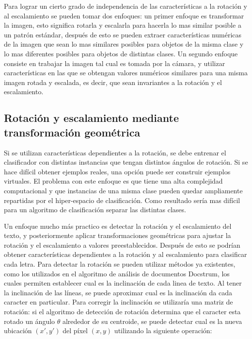 \documentclass[a4paper, 11pt, oneside]{report}
\begin{document}
Para lograr un cierto grado de independencia de las características a la rotación y al escalamiento se pueden tomar dos enfoques: un primer enfoque es transformar la imagen, esto significa rotarla y escalarla para hacerla lo mas similar posible a un patrón estándar, después de esto se pueden extraer características numéricas de la imagen que sean lo mas similares posibles para objetos de la misma clase y lo mas diferentes posibles para objetos de distintas clases. Un segundo enfoque consiste en trabajar la imagen tal cual es tomada por la cámara, y utilizar características en las que se obtengan valores numéricos similares para una misma imagen rotada y escalada, es decir, que sean invariantes a la rotación y el escalamiento.

\subsection{Rotación y escalamiento mediante transformación geométrica}
\label{sect:rotation}

Si se utilizan características dependientes a la rotación, se debe entrenar el clasificador con distintas instancias que tengan distintos ángulos de rotación. Si se hace difícil obtener ejemplos reales, una opción puede ser construir ejemplos virtuales\cite{niyogi2002}. El problema con este enfoque es que tiene una alta complejidad computacional y que instancias de una misma clase pueden quedar ampliamente repartidas por el hiper-espacio de clasificación. Como resultado sería mas difícil para un algoritmo de clasificación separar las distintas clases.

Un enfoque mucho más practico es detectar la rotación y el escalamiento del texto, y posteriormente aplicar transformaciones geométricas para ajustar la rotación y el escalamiento a valores preestablecidos. Después de esto se podrían obtener características dependientes a la rotación y al escalamiento para clasificar cada letra. Para detectar la rotación se pueden utilizar métodos ya existentes, como los utilizados en el algoritmo de análisis de documentos Docstrum\cite{Docstrum}, los cuales permiten establecer cual es la inclinación de cada linea de texto. Al tener la inclinación de las líneas, se puede aproximar cual es la inclinación da cada caracter en particular. Para corregir la inclinación se utilizaría una matriz de rotación: si el algoritmo de detección de rotación determina que el caracter esta rotado un ángulo $\theta$ alrededor de su centroide, se puede detectar cual es la nueva ubicación $(x', y')$ del píxel $(x, y)$ utilizando la siguiente operación:
\end{document}
